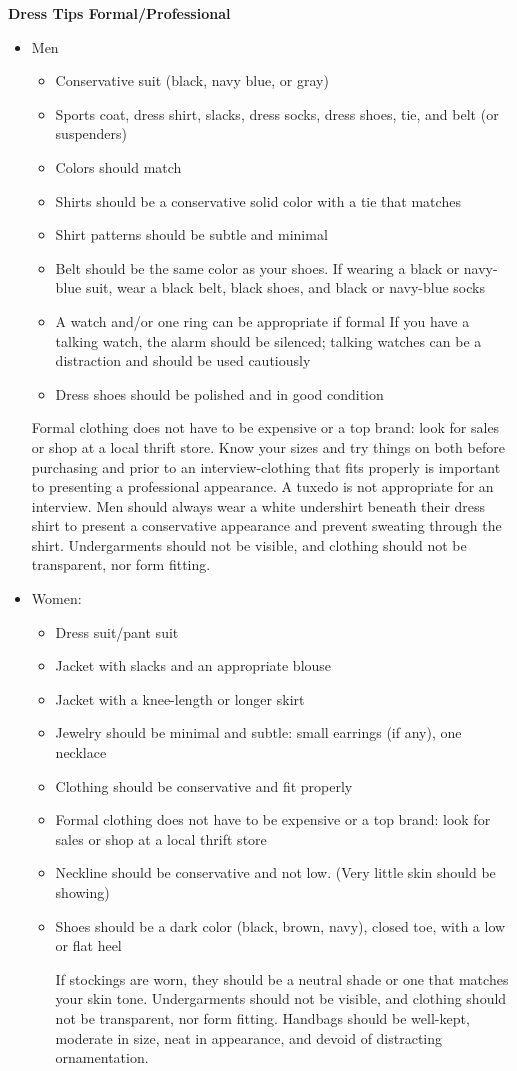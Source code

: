 \textbf{Dress Tips Formal/Professional }
\begin{itemize}[leftmargin=*]
\item Men
\begin{itemize}
\item Conservative suit (black, navy blue, or gray)
\item Sports coat, dress shirt, slacks, dress socks, dress shoes, tie, and belt (or suspenders)
\item Colors should match
\item Shirts should be a conservative solid color with a tie that matches
\item Shirt patterns should be subtle and minimal
\item Belt should be the same color as your shoes. If wearing a black or navy-blue suit, wear a black belt, black shoes, and black or navy-blue socks
\item A watch and/or one ring can be appropriate if formal If you have a talking watch, the alarm should be silenced; talking watches can be a distraction and should be used cautiously
\item Dress shoes should be polished and in good condition
\end{itemize}
Formal clothing does not have to be expensive or a top brand: look for sales or shop at a local thrift store. Know your sizes and try things on both before purchasing and prior to an interview-clothing that fits properly is important to presenting a professional appearance. A tuxedo is not appropriate for an interview. Men should always wear a white undershirt beneath their dress shirt to present a conservative appearance and prevent sweating through the shirt. Undergarments should not be visible, and clothing should not be transparent, nor form fitting.
\item Women:
\begin{itemize}
\item Dress suit/pant suit
\item Jacket with slacks and an appropriate blouse
\item Jacket with a knee-length or longer skirt
\item Jewelry should be minimal and subtle: small earrings (if any), one necklace
\item Clothing should be conservative and fit properly
\item Formal clothing does not have to be expensive or a top brand: look for sales or shop at a local thrift store
\item Neckline should be conservative and not low. (Very little skin should be showing)
\item Shoes should be a dark color (black, brown, navy), closed toe, with a low or flat heel

If stockings are worn, they should be a neutral shade or one that matches your skin tone. Undergarments should not be visible, and clothing should not be transparent, nor form fitting. Handbags should be well-kept, moderate in size, neat in appearance, and devoid of distracting ornamentation.
\end{itemize}\end{itemize}
